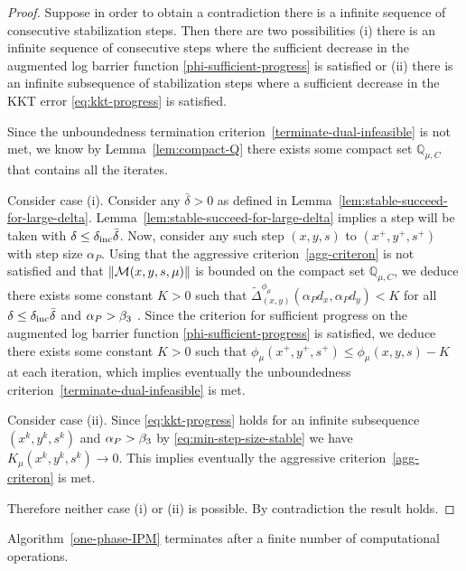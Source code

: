 \documentclass{article}
\begin{document}
\begin{proof}
Suppose in order to obtain a contradiction there is a infinite sequence of consecutive stabilization steps. Then there are two possibilities (i) there is an infinite sequence of consecutive steps where the sufficient decrease in the augmented log barrier function \eqref{phi-sufficient-progress} is satisfied or (ii) there is an infinite subsequence of stabilization steps where a sufficient decrease in the KKT error \eqref{eq:kkt-progress} is satisfied.

Since the unboundedness termination criterion~\eqref{terminate-dual-infeasible} is not met, we know by Lemma~\ref{lem:compact-Q} there exists some compact set $\mathbb{Q}_{\mu,C}$ that contains all the iterates.

Consider case (i). Consider any $\bar{\delta} > 0$ as defined in Lemma~\ref{lem:stable-succeed-for-large-delta}. Lemma~\ref{lem:stable-succeed-for-large-delta} implies a step will be taken with $\delta \le \delta_{\text{inc}} \bar{\delta}$. Now, consider any such step $(x,y,s)$ to $(x^{+}, y^{+}, s^{+})$ with step size $\alpha_{P}$. Using that the aggressive criterion~\eqref{agg-criteron} is not satisfied and that $\| \mathcal{M}(x,y,s, \mu) \|$ is bounded on the compact set $\mathbb{Q}_{\mu,C}$, we deduce there exists some constant $K > 0$ such that $\tilde{\Delta}^{\phi_{\mu}}_{(x,y)}(\alpha_{P} d_{x}, \alpha_{P} d_{y}) < K$ for all $\delta \le \delta_{\text{inc}} \bar{\delta}$ and $\alpha_{P} > \beta_{3}$ . Since the criterion for sufficient progress on the augmented log barrier function \eqref{phi-sufficient-progress} is satisfied, we deduce there exists some constant $K > 0$ such that $\phi_{\mu}(x^{+}, y^{+}, s^{+}) \le \phi_{\mu}(x, y, s) - K$ at each iteration, which implies eventually the unboundedness criterion~\eqref{terminate-dual-infeasible} is met. 

Consider case (ii). Since \eqref{eq:kkt-progress} holds for an infinite subsequence $(x^{k}, y^{k}, s^{k})$ and $\alpha_{P} > \beta_{3}$ by \eqref{eq:min-step-size-stable} we have $K_{\mu}(x^{k}, y^{k}, s^{k}) \rightarrow 0$. This implies eventually the aggressive criterion~\eqref{agg-criteron} is met.

Therefore neither case (i) or (ii) is possible. By contradiction the result holds.
\end{proof}


\begin{theorem}\label{thm:global-convergence}
Algorithm~\ref{one-phase-IPM} terminates after a finite number of computational operations.
\end{theorem}
\end{document}
